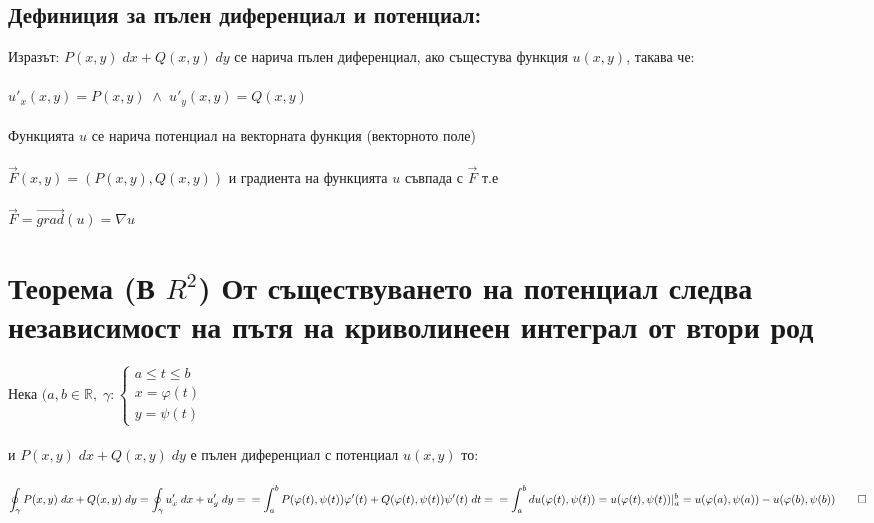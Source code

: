 \documentclass[14pt]{extarticle}
\newcommand{\R}{\mathbb{R}}
\newcommand{\Int}{\displaystyle\int}
\newcommand{\OInt}{\displaystyle\oint}
\newcommand{\Vector}[1]{\overrightarrow{#1}}
\begin{document}
\subsection*{Дефиниция за пълен диференциал и потенциал:}
Изразът: \(P(x, y)\; dx + Q(x, y) \; dy\) се нарича пълен диференциал, ако същестува функция \(u(x, y)\), такава че: \\\\
\(u'_x(x, y) = P(x, y) \; \land \; u'_y(x, y) = Q(x, y)\) \\\\
Функцията \(u\) се нарича потенциал на векторната функция (векторното поле) \\\\
\(\Vector{F}(x, y) = (P(x, y), Q(x, y))\) и градиента на функцията \(u\) съвпада с \(\Vector{F}\) т.е \\\\
\(\Vector{F} = \Vector{grad}(u) = \nabla u\)
\section*{Теорема (В \(R^2\)) От съществуването на потенциал следва независимост на пътя на криволинеен интеграл от втори род}
Нека \((a, b \in \R, \; \gamma : \begin{cases}
    a \leq t \leq b \\
    x = \varphi(t) \\
    y = \psi(t)
\end{cases} \) \\\\
и \(P(x, y)\; dx + Q(x, y) \; dy\)
е пълен диференциал с потенциал \(u(x, y)\) то: \\\\
\(\OInt_\gamma P(x, y)\; dx + Q(x, y) \; dy = \OInt_\gamma u'_x\; dx + u'_y \; dy = \\\\
= \Int_a^b P(\varphi(t), \psi(t))\varphi'(t) + Q(\varphi(t), \psi(t))\psi'(t) \; dt = \\\\
= \Int_a^b du(\varphi(t), \psi(t)) = u(\varphi(t), \psi(t))|_a^b = u(\varphi(a), \psi(a)) - u(\varphi(b), \psi(b)) \qed \) 
\end{document}
